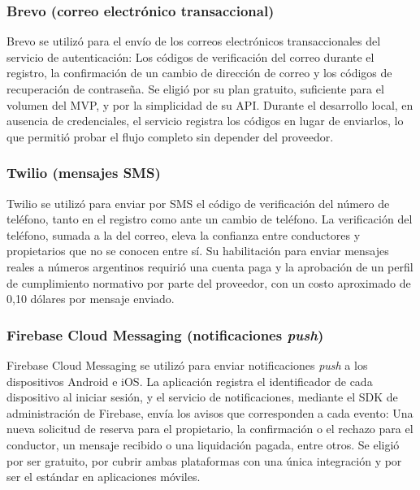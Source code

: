 \subsubsection{Brevo (correo electrónico transaccional)}

Brevo \autocite{brevo} se utilizó para el envío de los correos electrónicos transaccionales del servicio de autenticación: Los códigos de verificación del correo durante el registro, la confirmación de un cambio de dirección de correo y los códigos de recuperación de contraseña. Se eligió por su plan gratuito, suficiente para el volumen del MVP, y por la simplicidad de su API. Durante el desarrollo local, en ausencia de credenciales, el servicio registra los códigos en lugar de enviarlos, lo que permitió probar el flujo completo sin depender del proveedor.

\subsubsection{Twilio (mensajes SMS)}

Twilio \autocite{twilio} se utilizó para enviar por SMS el código de verificación del número de teléfono, tanto en el registro como ante un cambio de teléfono. La verificación del teléfono, sumada a la del correo, eleva la confianza entre conductores y propietarios que no se conocen entre sí. Su habilitación para enviar mensajes reales a números argentinos requirió una cuenta paga y la aprobación de un perfil de cumplimiento normativo por parte del proveedor, con un costo aproximado de 0,10 dólares por mensaje enviado.

\subsubsection{Firebase Cloud Messaging (notificaciones \textit{push})}

Firebase Cloud Messaging \autocite{firebase} se utilizó para enviar notificaciones \textit{push} a los dispositivos Android e iOS. La aplicación registra el identificador de cada dispositivo al iniciar sesión, y el servicio de notificaciones, mediante el SDK de administración de Firebase, envía los avisos que corresponden a cada evento: Una nueva solicitud de reserva para el propietario, la confirmación o el rechazo para el conductor, un mensaje recibido o una liquidación pagada, entre otros. Se eligió por ser gratuito, por cubrir ambas plataformas con una única integración y por ser el estándar en aplicaciones móviles.

